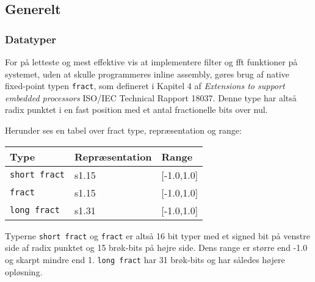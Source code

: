 \subsection*{Generelt}

\subsubsection{Datatyper}
For på letteste og mest effektive vis at implementere filter og fft funktioner på systemet, uden at skulle programmeres inline assembly, gøres brug af native fixed-point typen \verb+fract+, som defineret i Kapitel 4 af \textit{Extensions to support embedded processors} ISO/IEC Technical Rapport 18037. 
Denne type har altså radix punktet i en fast position med et antal fractionelle bits over nul. 

Herunder ses en tabel over fract type, repræsentation og range:

\begin{center}
    \begin{tabular}{ | p{} | p{} | p{} |}
    \hline
    \textbf{Type}				& \textbf{Repræsentation}	& \textbf{Range}	\\ \hline
    \verb+short fract+ 			& s1.15						& [-1.0,1.0]		\\ \hline
    \verb+fract+ 				& s1.15						& [-1.0,1.0]		\\ \hline
    \verb+long fract+ 			& s1.31						& [-1.0,1.0]		\\ \hline
    \end{tabular}
\end{center}

Typerne \verb+short fract+ og \verb+fract+ er altså 16 bit typer med et signed bit på venstre side af radix punktet og 15 brøk-bits på højre side. Dens range er større end -1.0 og skarpt mindre end 1. \verb+long fract+ har 31 brøk-bits og har således højere opløsning.
